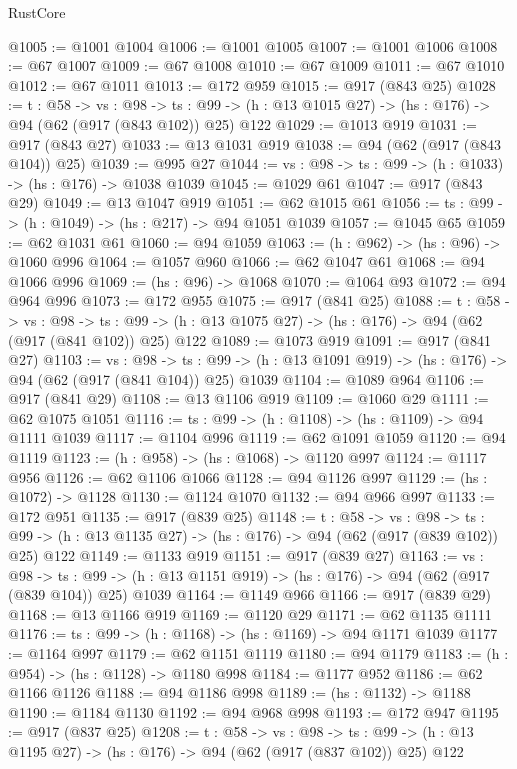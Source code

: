 \begin{lexlean}{RustCore}
\begin{coremodule}
@1005 := @1001 @1004
@1006 := @1001 @1005
@1007 := @1001 @1006
@1008 := @67 @1007
@1009 := @67 @1008
@1010 := @67 @1009
@1011 := @67 @1010
@1012 := @67 @1011
@1013 := @172 @959
@1015 := @917 (@843 @25)
@1028 := {t : @58} ->
  {vs : @98} ->
  {ts : @99} -> (h : @13 @1015 @27) -> (hs : @176) -> @94 (@62 (@917 (@843 @102)) @25) @122
@1029 := @1013 @919
@1031 := @917 (@843 @27)
@1033 := @13 @1031 @919
@1038 := @94 (@62 (@917 (@843 @104)) @25)
@1039 := @995 @27
@1044 := {vs : @98} -> {ts : @99} -> (h : @1033) -> (hs : @176) -> @1038 @1039
@1045 := @1029 @61
@1047 := @917 (@843 @29)
@1049 := @13 @1047 @919
@1051 := @62 @1015 @61
@1056 := {ts : @99} -> (h : @1049) -> (hs : @217) -> @94 @1051 @1039
@1057 := @1045 @65
@1059 := @62 @1031 @61
@1060 := @94 @1059
@1063 := (h : @962) -> (hs : @96) -> @1060 @996
@1064 := @1057 @960
@1066 := @62 @1047 @61
@1068 := @94 @1066 @996
@1069 := (hs : @96) -> @1068
@1070 := @1064 @93
@1072 := @94 @964 @996
@1073 := @172 @955
@1075 := @917 (@841 @25)
@1088 := {t : @58} ->
  {vs : @98} ->
  {ts : @99} -> (h : @13 @1075 @27) -> (hs : @176) -> @94 (@62 (@917 (@841 @102)) @25) @122
@1089 := @1073 @919
@1091 := @917 (@841 @27)
@1103 := {vs : @98} ->
  {ts : @99} -> (h : @13 @1091 @919) -> (hs : @176) -> @94 (@62 (@917 (@841 @104)) @25) @1039
@1104 := @1089 @964
@1106 := @917 (@841 @29)
@1108 := @13 @1106 @919
@1109 := @1060 @29
@1111 := @62 @1075 @1051
@1116 := {ts : @99} -> (h : @1108) -> (hs : @1109) -> @94 @1111 @1039
@1117 := @1104 @996
@1119 := @62 @1091 @1059
@1120 := @94 @1119
@1123 := (h : @958) -> (hs : @1068) -> @1120 @997
@1124 := @1117 @956
@1126 := @62 @1106 @1066
@1128 := @94 @1126 @997
@1129 := (hs : @1072) -> @1128
@1130 := @1124 @1070
@1132 := @94 @966 @997
@1133 := @172 @951
@1135 := @917 (@839 @25)
@1148 := {t : @58} ->
  {vs : @98} ->
  {ts : @99} -> (h : @13 @1135 @27) -> (hs : @176) -> @94 (@62 (@917 (@839 @102)) @25) @122
@1149 := @1133 @919
@1151 := @917 (@839 @27)
@1163 := {vs : @98} ->
  {ts : @99} -> (h : @13 @1151 @919) -> (hs : @176) -> @94 (@62 (@917 (@839 @104)) @25) @1039
@1164 := @1149 @966
@1166 := @917 (@839 @29)
@1168 := @13 @1166 @919
@1169 := @1120 @29
@1171 := @62 @1135 @1111
@1176 := {ts : @99} -> (h : @1168) -> (hs : @1169) -> @94 @1171 @1039
@1177 := @1164 @997
@1179 := @62 @1151 @1119
@1180 := @94 @1179
@1183 := (h : @954) -> (hs : @1128) -> @1180 @998
@1184 := @1177 @952
@1186 := @62 @1166 @1126
@1188 := @94 @1186 @998
@1189 := (hs : @1132) -> @1188
@1190 := @1184 @1130
@1192 := @94 @968 @998
@1193 := @172 @947
@1195 := @917 (@837 @25)
@1208 := {t : @58} ->
  {vs : @98} ->
  {ts : @99} -> (h : @13 @1195 @27) -> (hs : @176) -> @94 (@62 (@917 (@837 @102)) @25) @122

\end{coremodule}
\end{lexlean}
